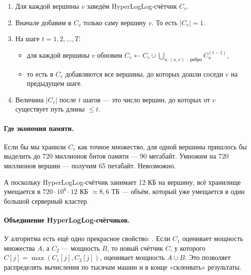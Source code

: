 \begin{algorithmbox}[title={Алгоритм: оценка расстояний в графе через подсчёт «соседей»}]
\begin{enumerate}
  \item Для каждой вершины $v$ заведём HyperLogLog-счётчик $C_v$.
  \item Вначале добавим в $C_v$ только саму вершину $v$. То есть $|C_v| = 1$.
  \item На шаге $t = 1, 2, \dots, T$:
  \begin{itemize}
    \item для каждой вершины $v$ обновим $C_v \leftarrow C_v \cup \bigcup_{u: (u,v) \text{ -- ребро}} C_u^{(t-1)}$,
    \item то есть в $C_v$ добавляются все вершины, до которых дошли соседи $v$ на предыдущем шаге.
  \end{itemize}
  \item Величина $|C_v|$ после $t$ шагов --- это число вершин, до которых от $v$ существует путь длины $\le t$.
\end{enumerate}
\end{algorithmbox}

\paragraph*{Где экономия памяти.} Если бы мы хранили $C_v$ как точное множество, для одной вершины пришлось бы выделить до 720 миллионов битов памяти --- 90 мегабайт. Умножим на 720 миллионов вершин --- получим 65 петабайт. Невозможно.

А поскольку HyperLogLog-счётчик занимает 12 КБ на вершину, всё хранилище умещается в $720{\cdot}10^6 \cdot 12$ КБ $\approx 8{,}6$ ТБ --- объём, который уже умещается в один большой серверный кластер.

\paragraph*{Объединение HyperLogLog-счётчиков.} У алгоритма есть ещё одно прекрасное свойство: . Если $C_1$ оценивает мощность множества $A$, а $C_2$ --- мощность $B$, то новый счётчик $C$, у которого $C[j] = \max(C_1[j], C_2[j])$, оценивает мощность $A \cup B$. Это позволяет распределять вычисления по тысячам машин и в конце «склеивать» результаты.

